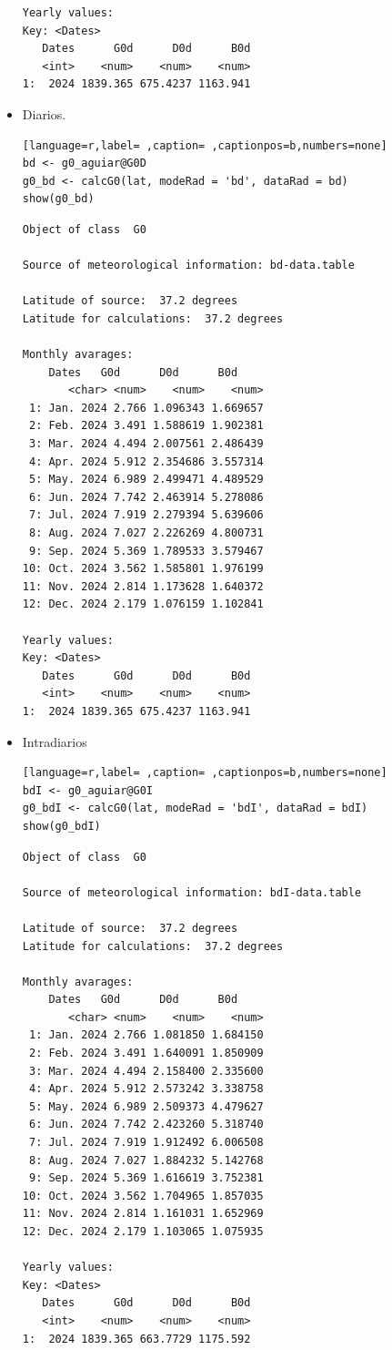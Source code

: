\begin{itemize}
\begin{verbatim}
Yearly values:
Key: <Dates>
   Dates      G0d      D0d      B0d
   <int>    <num>    <num>    <num>
1:  2024 1839.365 675.4237 1163.941
\end{verbatim}

\item Diarios.
\begin{lstlisting}[language=r,label= ,caption= ,captionpos=b,numbers=none]
bd <- g0_aguiar@G0D
g0_bd <- calcG0(lat, modeRad = 'bd', dataRad = bd)
show(g0_bd)
\end{lstlisting}

\begin{verbatim}
Object of class  G0 

Source of meteorological information: bd-data.table 

Latitude of source:  37.2 degrees
Latitude for calculations:  37.2 degrees

Monthly avarages:
	Dates   G0d      D0d      B0d
       <char> <num>    <num>    <num>
 1: Jan. 2024 2.766 1.096343 1.669657
 2: Feb. 2024 3.491 1.588619 1.902381
 3: Mar. 2024 4.494 2.007561 2.486439
 4: Apr. 2024 5.912 2.354686 3.557314
 5: May. 2024 6.989 2.499471 4.489529
 6: Jun. 2024 7.742 2.463914 5.278086
 7: Jul. 2024 7.919 2.279394 5.639606
 8: Aug. 2024 7.027 2.226269 4.800731
 9: Sep. 2024 5.369 1.789533 3.579467
10: Oct. 2024 3.562 1.585801 1.976199
11: Nov. 2024 2.814 1.173628 1.640372
12: Dec. 2024 2.179 1.076159 1.102841

Yearly values:
Key: <Dates>
   Dates      G0d      D0d      B0d
   <int>    <num>    <num>    <num>
1:  2024 1839.365 675.4237 1163.941
\end{verbatim}

\item Intradiarios
\begin{lstlisting}[language=r,label= ,caption= ,captionpos=b,numbers=none]
bdI <- g0_aguiar@G0I
g0_bdI <- calcG0(lat, modeRad = 'bdI', dataRad = bdI)
show(g0_bdI)
\end{lstlisting}

\begin{verbatim}
Object of class  G0 

Source of meteorological information: bdI-data.table 

Latitude of source:  37.2 degrees
Latitude for calculations:  37.2 degrees

Monthly avarages:
	Dates   G0d      D0d      B0d
       <char> <num>    <num>    <num>
 1: Jan. 2024 2.766 1.081850 1.684150
 2: Feb. 2024 3.491 1.640091 1.850909
 3: Mar. 2024 4.494 2.158400 2.335600
 4: Apr. 2024 5.912 2.573242 3.338758
 5: May. 2024 6.989 2.509373 4.479627
 6: Jun. 2024 7.742 2.423260 5.318740
 7: Jul. 2024 7.919 1.912492 6.006508
 8: Aug. 2024 7.027 1.884232 5.142768
 9: Sep. 2024 5.369 1.616619 3.752381
10: Oct. 2024 3.562 1.704965 1.857035
11: Nov. 2024 2.814 1.161031 1.652969
12: Dec. 2024 2.179 1.103065 1.075935

Yearly values:
Key: <Dates>
   Dates      G0d      D0d      B0d
   <int>    <num>    <num>    <num>
1:  2024 1839.365 663.7729 1175.592
\end{verbatim}
\end{itemize}

